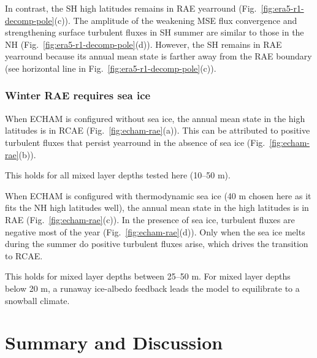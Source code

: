 \documentclass{ametsocV5}
\begin{document}
    In contrast, the SH high latitudes remains in RAE yearround (Fig.~\ref{fig:era5-r1-decomp-pole}(c)). The amplitude of the weakening MSE flux convergence and strengthening surface turbulent fluxes in SH summer are similar to those in the NH (Fig.~\ref{fig:era5-r1-decomp-pole}(d)). However, the SH remains in RAE yearround because its annual mean state is farther away from the RAE boundary (see horizontal line in Fig.~\ref{fig:era5-r1-decomp-pole}(c)).

    \subsubsection{Winter RAE requires sea ice}
        When ECHAM is configured without sea ice, the annual mean state in the high latitudes is in RCAE (Fig.~\ref{fig:echam-rae}(a)). This can be attributed to positive turbulent fluxes that persist yearround in the absence of sea ice (Fig.~\ref{fig:echam-rae}(b)).
        
        This holds for all mixed layer depths tested here (10--50 m).
        
        When ECHAM is configured with thermodynamic sea ice (40 m chosen here as it fits the NH high latitudes well), the annual mean state in the high latitudes is in RAE (Fig.~\ref{fig:echam-rae}(c)). In the presence of sea ice, turbulent fluxes are negative most of the year (Fig.~\ref{fig:echam-rae}(d)). Only when the sea ice melts during the summer do positive turbulent fluxes arise, which drives the transition to RCAE.
        
        This holds for mixed layer depths between 25--50 m. For mixed layer depths below 20 m, a runaway ice-albedo feedback leads the model to equilibrate to a snowball climate.

\section{Summary and Discussion}
\end{document}
